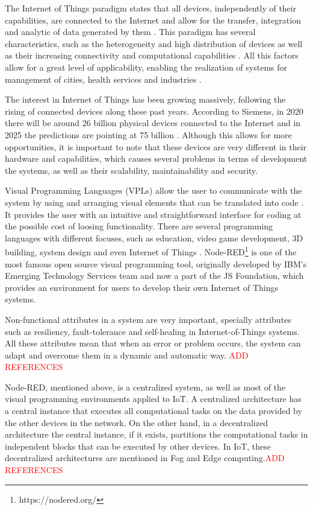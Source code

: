 The Internet of Things paradigm states that all devices, independently of their capabilities, are connected to the Internet and allow for the transfer, integration and analytic of data generated by them \cite{Buyya:2016:ITP:3050877}. This paradigm has several characteristics, such as the heterogeneity and high distribution of devices as well as their increasing connectivity and computational capabilities \cite{SoS}. All this factors allow for a great level of applicability, enabling the realization of systems for management of cities, health services and industries \cite{6851114}.
\par The interest in Internet of Things has been growing massively, following the rising of connected devices along these past years. According to Siemens, in 2020 there will be around 26 billion physical devices connected to the Internet and in 2025 the predictions are pointing at 75 billion \cite{tanweer}. Although this allows for more opportunities, it is important to note that these devices are very different in their hardware and capabilities, which causes several problems in terms of development the systems, as well as their scalability, maintainability and security. 
\par Visual Programming Languages (VPLs) allow the user to communicate with the system by using and arranging visual elements that can be translated into code \cite{vpl-book}. It provides the user with an intuitive and straightforward interface for coding at the possible cost of loosing functionality. There are several programming languages with different focuses, such as education, video game development, 3D building, system design and even Internet of Things \cite{survey_vpl_iot}. Node-RED\footnote{https://nodered.org/} is one of the most famous open source visual programming tool, originally developed by IBM’s Emerging Technology Services team and now a part of the JS Foundation, which provides an environment for users to develop their own Internet of Things systems.
\par Non-functional attributes in a system are very important, specially attributes such as resiliency, fault-tolerance and self-healing in Internet-of-Things systems. All these attributes mean that when an error or problem occurs, the system can adapt and overcome them in a dynamic and automatic way. \textcolor{red}{ADD REFERENCES}
\par Node-RED, mentioned above, is a centralized system, as well as most of the visual programming environments applied to IoT. A centralized architecture has a central instance that executes all computational tasks on the data provided by the other devices in the network. On the other hand, in a decentralized architecture the central instance, if it exists, partitions the computational tasks in independent blocks that can be executed by other devices. In IoT, these decentralized architectures are mentioned in Fog and Edge computing.\textcolor{red}{ADD REFERENCES}

